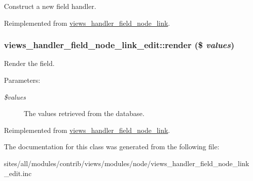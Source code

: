 Construct a new field handler. 

Reimplemented from \hyperlink{classviews__handler__field__node__link_c3f643ba7dd0435fc03c7bf477907484}{views\_\-handler\_\-field\_\-node\_\-link}.\hypertarget{classviews__handler__field__node__link__edit_86877ed929d2fcb0b8204c0907cf5b5c}{
\subsubsection[{render}]{\setlength{\rightskip}{0pt plus 5cm}views\_\-handler\_\-field\_\-node\_\-link\_\-edit::render (\$ {\em values})}}
\label{classviews__handler__field__node__link__edit_86877ed929d2fcb0b8204c0907cf5b5c}


Render the field.

\begin{Desc}
\item[Parameters:]
\begin{description}
\item[{\em \$values}]The values retrieved from the database. \end{description}
\end{Desc}


Reimplemented from \hyperlink{classviews__handler__field__node__link_9621ff38a6b318eb94f0c44fa2f711f5}{views\_\-handler\_\-field\_\-node\_\-link}.

The documentation for this class was generated from the following file:\begin{CompactItemize}
\item 
sites/all/modules/contrib/views/modules/node/views\_\-handler\_\-field\_\-node\_\-link\_\-edit.inc\end{CompactItemize}
